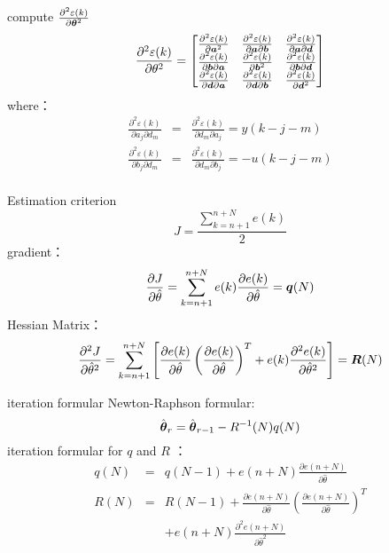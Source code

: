 \begin{frame}{compute $\frac{\partial^2\varepsilon(k)}{\partial\boldsymbol{\theta}^2}$}
$$
\frac{\partial^2\varepsilon(k)}{\partial\theta^2} = 
\begin{bmatrix}
\frac{\partial^2\varepsilon(k)}{\partial\boldsymbol{a}^2} & \frac{\partial^2\varepsilon(k)}{\partial\boldsymbol{a}\partial\boldsymbol{b}} & \frac{\partial^2\varepsilon(k)}{\partial\boldsymbol{a}\partial\boldsymbol{d}}  \\
\frac{\partial^2\varepsilon(k)}{\partial\boldsymbol{b}\partial\boldsymbol{a}} &\frac{\partial^2\varepsilon(k)}{\partial\boldsymbol{b}^2} &  \frac{\partial^2\varepsilon(k)}{\partial\boldsymbol{b}\partial\boldsymbol{d}} \\
\frac{\partial^2\varepsilon(k)}{\partial\boldsymbol{d}\partial\boldsymbol{a}} &  \frac{\partial^2\varepsilon(k)}{\partial\boldsymbol{d}\partial\boldsymbol{b}} &\frac{\partial^2\varepsilon(k)}{\partial\boldsymbol{d}^2} 
\end{bmatrix}
$$
where：
\begin{eqnarray*}
\frac{\partial^2\varepsilon(k)}{\partial a_j\partial d_m} &=& \frac{\partial^2\varepsilon(k)}{\partial d_m\partial a_j} = y(k-j-m)  \\
\frac{\partial^2\varepsilon(k)}{\partial b_j\partial d_m} &=& \frac{\partial^2\varepsilon(k)}{\partial d_m\partial b_j} = -u(k-j-m)  \\
\end{eqnarray*}
\end{frame}

\begin{frame}{ Estimation criterion }
$$
J=\frac{\sum_{k=n+1}^{n+N}e(k)}{2}
$$
gradient：
$$\frac{\partial J}{\partial\hat\theta} = \sum_{k=n+1}^{n+N}e(k)\frac{\partial e(k)}{\partial\hat\theta}=\boldsymbol{q}(N)$$
Hessian Matrix：
$$
\frac{\partial^2 J}{\partial\hat\theta^2} = \sum_{k=n+1}^{n+N}\left[\frac{\partial e(k)}{\partial\hat\theta}\left(\frac{\partial e(k)}{\partial \hat\theta}\right)^T + e(k)\frac{\partial^2 e(k)}{\partial \hat\theta^2} \right]=\boldsymbol{R}(N)
$$
\end{frame}

\begin{frame}{iteration formular}
Newton-Raphson formular:
$$
\hat{\boldsymbol{\theta}}_r=\hat{\boldsymbol{\theta}}_{r-1}-R^{-1}(N)q(N)
$$
iteration formular for $q$ and $R$ ：
\begin{eqnarray*}
q(N) &=& q(N-1)+e(n+N)\frac{\partial e(n+N)}{\partial\hat\theta}\\
R(N) &=& R(N-1) +\frac{\partial e(n+N)}{\partial\hat\theta}\left(\frac{\partial e(n+N)}{\partial\hat\theta}\right)^T \\
&& +e(n+N)\frac{\partial^2 e(n+N)}{\partial\hat\theta^2} 
\end{eqnarray*}
\end{frame}





